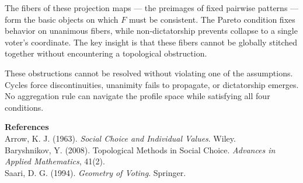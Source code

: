 \begin{technical}
The fibers of these projection maps — the preimages of fixed pairwise patterns — form the basic objects on which \(F\) must be consistent. The Pareto condition fixes behavior on unanimous fibers, while non-dictatorship prevents collapse to a single voter’s coordinate. The key insight is that these fibers cannot be globally stitched together without encountering a topological obstruction.

These obstructions cannot be resolved without violating one of the assumptions. Cycles force discontinuities, unanimity fails to propagate, or dictatorship emerges. No aggregation rule can navigate the profile space while satisfying all four conditions.

\vspace{0.5em}
\noindent\textbf{References}\\
Arrow, K. J. (1963). \textit{Social Choice and Individual Values}. Wiley.\\
Baryshnikov, Y. (2008). Topological Methods in Social Choice. \textit{Advances in Applied Mathematics}, 41(2).\\
Saari, D. G. (1994). \textit{Geometry of Voting}. Springer.
\end{technical}
